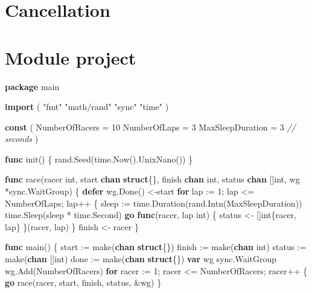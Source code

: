 \documentclass[]{book}
\newenvironment{Shaded}{\begin{snugshade}}{\end{snugshade}}
\newcommand{\BuiltInTok}[1]{#1}
\newcommand{\CommentTok}[1]{\textcolor[rgb]{0.56,0.35,0.01}{\textit{#1}}}
\newcommand{\DataTypeTok}[1]{\textcolor[rgb]{0.13,0.29,0.53}{#1}}
\newcommand{\DecValTok}[1]{\textcolor[rgb]{0.00,0.00,0.81}{#1}}
\newcommand{\KeywordTok}[1]{\textcolor[rgb]{0.13,0.29,0.53}{\textbf{#1}}}
\newcommand{\NormalTok}[1]{#1}
\newcommand{\StringTok}[1]{\textcolor[rgb]{0.31,0.60,0.02}{#1}}
\begin{document}
\hypertarget{cancellation}{%
\section{Cancellation}\label{cancellation}}

\hypertarget{module-project-5}{%
\section*{Module project}\label{module-project-5}}

\begin{Shaded}
\begin{Highlighting}[]
\KeywordTok{package}\NormalTok{ main}

\KeywordTok{import}\NormalTok{ (}
    \StringTok{"fmt"}
    \StringTok{"math/rand"}
    \StringTok{"sync"}
    \StringTok{"time"}
\NormalTok{)}

\KeywordTok{const}\NormalTok{ (}
\NormalTok{    NumberOfRacers   = }\DecValTok{10}
\NormalTok{    NumberOfLaps     = }\DecValTok{3}
\NormalTok{    MaxSleepDuration = }\DecValTok{3} \CommentTok{// seconds}
\NormalTok{)}

\KeywordTok{func}\NormalTok{ init() \{}
\NormalTok{    rand.Seed(time.Now().UnixNano())}
\NormalTok{\}}

\KeywordTok{func}\NormalTok{ race(racer }\DataTypeTok{int}\NormalTok{, start }\KeywordTok{chan} \KeywordTok{struct}\NormalTok{\{\}, finish }\KeywordTok{chan} \DataTypeTok{int}\NormalTok{, status }\KeywordTok{chan}\NormalTok{ []}\DataTypeTok{int}\NormalTok{, wg *sync.WaitGroup) \{}
    \KeywordTok{defer}\NormalTok{ wg.Done()}
\NormalTok{    <-start}
    \KeywordTok{for}\NormalTok{ lap := }\DecValTok{1}\NormalTok{; lap <= NumberOfLaps; lap++ \{}
\NormalTok{        sleep := time.Duration(rand.Intn(MaxSleepDuration))}
\NormalTok{        time.Sleep(sleep * time.Second)}
        \KeywordTok{go} \KeywordTok{func}\NormalTok{(racer, lap }\DataTypeTok{int}\NormalTok{) \{}
\NormalTok{            status <- []}\DataTypeTok{int}\NormalTok{\{racer, lap\}}
\NormalTok{        \}(racer, lap)}
\NormalTok{    \}}
\NormalTok{    finish <- racer}
\NormalTok{\}}

\KeywordTok{func}\NormalTok{ main() \{}
\NormalTok{    start := }\BuiltInTok{make}\NormalTok{(}\KeywordTok{chan} \KeywordTok{struct}\NormalTok{\{\})}
\NormalTok{    finish := }\BuiltInTok{make}\NormalTok{(}\KeywordTok{chan} \DataTypeTok{int}\NormalTok{)}
\NormalTok{    status := }\BuiltInTok{make}\NormalTok{(}\KeywordTok{chan}\NormalTok{ []}\DataTypeTok{int}\NormalTok{)}
\NormalTok{    done := }\BuiltInTok{make}\NormalTok{(}\KeywordTok{chan} \KeywordTok{struct}\NormalTok{\{\})}
    \KeywordTok{var}\NormalTok{ wg sync.WaitGroup}
\NormalTok{    wg.Add(NumberOfRacers)}
    \KeywordTok{for}\NormalTok{ racer := }\DecValTok{1}\NormalTok{; racer <= NumberOfRacers; racer++ \{}
        \KeywordTok{go}\NormalTok{ race(racer, start, finish, status, &wg)}
\NormalTok{    \}}


\end{Highlighting}
\end{Shaded}
\end{document}
